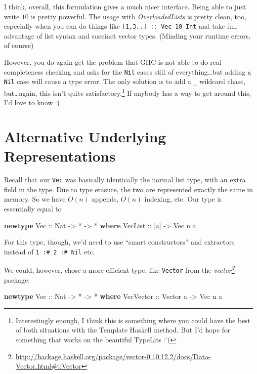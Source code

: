 \documentclass[]{article}
\newenvironment{Shaded}{}{}
\newcommand{\KeywordTok}[1]{\textcolor[rgb]{0.00,0.44,0.13}{\textbf{{#1}}}}
\newcommand{\DataTypeTok}[1]{\textcolor[rgb]{0.56,0.13,0.00}{{#1}}}
\newcommand{\OtherTok}[1]{\textcolor[rgb]{0.00,0.44,0.13}{{#1}}}
\newcommand{\FunctionTok}[1]{\textcolor[rgb]{0.02,0.16,0.49}{{#1}}}
\newcommand{\NormalTok}[1]{{#1}}
\renewcommand{\href}[2]{#2\footnote{\url{#1}}}
\begin{document}
I think, overall, this formulation gives a much nicer interface. Being able to
just write \(10\) is pretty powerful. The usage with \emph{OverloadedLists} is
pretty clean, too, especially when you can do things like
\texttt{{[}1,3..{]}\ ::\ Vec\ 10\ Int} and take full advantage of list syntax
and succinct vector types. (Minding your runtime errors, of course)

However, you do again get the problem that GHC is not able to do real
completeness checking and asks for the \texttt{Nil} cases still of
everything\ldots{}but adding a \texttt{Nil} case will cause a type error. The
only solution is to add a \texttt{\_} wildcard chase, but\ldots{}again, this
isn't quite satisfactory.\footnote{Interestingly enough, I think this is
  something where you could have the best of both situations with the Template
  Haskell method. But I'd hope for something that works on the beautiful
  TypeLits :'(} If anybody has a way to get around this, I'd love to know :)

\section{Alternative Underlying
Representations}\label{alternative-underlying-representations}

Recall that our \texttt{Vec} was basically identically the normal list type,
with an extra field in the type. Due to type erasure, the two are represented
exactly the same in memory. So we have \(O(n)\) appends, \(O(n)\) indexing, etc.
Our type is essentially equal to

\begin{Shaded}
\begin{Highlighting}[]
\KeywordTok{newtype} \DataTypeTok{Vec}\OtherTok{ ::} \DataTypeTok{Nat} \OtherTok{->} \FunctionTok{*} \OtherTok{->} \FunctionTok{*} \KeywordTok{where}
    \DataTypeTok{VecList}\OtherTok{ ::} \NormalTok{[a] }\OtherTok{->} \DataTypeTok{Vec} \NormalTok{n a}
\end{Highlighting}
\end{Shaded}

For this type, though, we'd need to use ``smart constructors'' and extractors
instead of \texttt{1\ :\#\ 2\ :\#\ Nil} etc.

We could, however, chose a more efficient type, like \texttt{Vector} from the
\emph{\href{http://hackage.haskell.org/package/vector-0.10.12.2/docs/Data-Vector.html\#t:Vector}{vector}}
package:

\begin{Shaded}
\begin{Highlighting}[]
\KeywordTok{newtype} \DataTypeTok{Vec}\OtherTok{ ::} \DataTypeTok{Nat} \OtherTok{->} \FunctionTok{*} \OtherTok{->} \FunctionTok{*} \KeywordTok{where}
    \DataTypeTok{VecVector}\OtherTok{ ::} \DataTypeTok{Vector} \NormalTok{a }\OtherTok{->} \DataTypeTok{Vec} \NormalTok{n a}
\end{Highlighting}
\end{Shaded}
\end{document}
